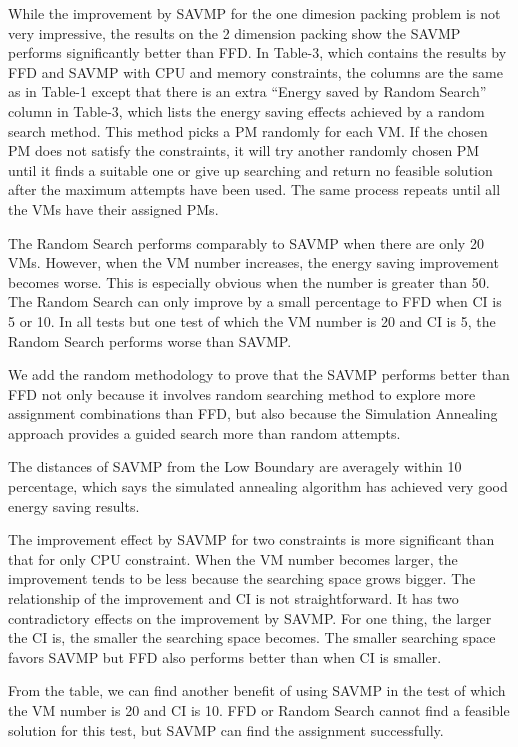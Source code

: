 \documentclass[10pt, conference, compsocconf]{IEEEtran}
\begin{document}
While the improvement by SAVMP for the one dimesion packing problem is not very
impressive, the results on the 2 dimension packing show the SAVMP performs
significantly better than FFD. In Table-3, which contains the results by FFD and
SAVMP with CPU and memory constraints, the columns are the same as in Table-1
except that there is an extra ``Energy saved by Random Search'' column in
Table-3, which lists the energy saving effects achieved by a random search
method. This method picks a PM randomly for each VM. If the chosen PM does not
satisfy the constraints, it will try another randomly chosen PM until it finds a
suitable one or give up searching and return no feasible solution after the
maximum attempts have been used. The same process repeats until all the VMs have
their assigned PMs.

The Random Search performs comparably to SAVMP when there are only 20 VMs.
However, when the VM number increases, the energy saving improvement becomes
worse. This is especially obvious when the number is greater than 50. The Random
Search can only improve by a small percentage to FFD when CI is 5 or 10. In all
tests but one test of which the VM number is 20 and CI is 5, the Random Search
performs worse than SAVMP.

We add the random methodology to prove that the SAVMP performs better than FFD
not only because it involves random searching method to explore more assignment
combinations than FFD, but also because the Simulation Annealing approach
provides a guided search more than random attempts.

The distances of SAVMP from the Low Boundary are averagely within 10 percentage,
which says the simulated annealing algorithm has achieved very good energy
saving results.

The improvement effect by SAVMP for two constraints is more significant than
that for only CPU constraint. When the VM number becomes larger, the improvement
tends to be less because the searching space grows bigger. The relationship of
the improvement and CI is not straightforward. It has two contradictory effects
on the improvement by SAVMP. For one thing, the larger the CI is, the smaller
the searching space becomes. The smaller searching space favors SAVMP but FFD
also performs better than when CI is smaller.

From the table, we can find another benefit of using SAVMP in the test of which
the VM number is 20 and CI is 10. FFD or Random Search cannot find a feasible
solution for this test, but SAVMP can find the assignment successfully.
\end{document}
